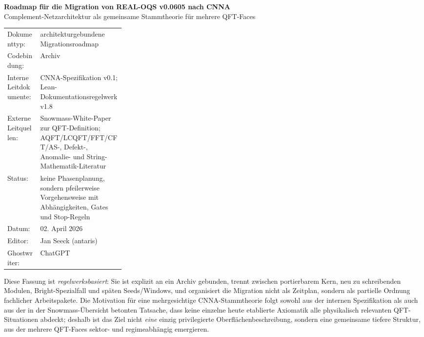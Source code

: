 \documentclass[11pt,a4paper]{article}
\let\oldpath\path
\renewcommand{\path}[1]{\oldpath{#1}}
\begin{document}

\begin{titlepage}
\centering
{\Large \textbf{Roadmap für die Migration von REAL-OQS v0.0605 nach CNNA}}\\[0.7em]
{\large Complement-Netzarchitektur als gemeinsame Stammtheorie für mehrere QFT-Faces}\\[2em]
\begin{tabularx}{0.92\linewidth}{@{}L{0.28\linewidth}X@{}}
Dokumenttyp: & architekturgebundene Migrationsroadmap \\
Codebindung: & Archiv  \\
Interne Leitdokumente: & CNNA-Spezifikation v0.1; Lean-Dokumentationsregelwerk v1.8 \\
Externe Leitquellen: & Snowmass-White-Paper zur QFT-Definition; AQFT/LCQFT/FFT/CFT/AS-, Defekt-, Anomalie- und String-Mathematik-Literatur \\
Status: & keine Phasenplanung, sondern pfeilerweise Vorgehensweise mit Abhängigkeiten, Gates und Stop-Regeln \\
Datum: & 02. April 2026 \\
Editor: & Jan Seeck (antaris) \\
Ghostwriter: & ChatGPT
\end{tabularx}
\vfill
\begin{minipage}{0.92\linewidth}
\small
Diese Fassung ist \emph{regelwerksbasiert}: Sie ist explizit an ein Archiv gebunden, trennt zwischen
portierbarem Kern, neu zu schreibenden Modulen, Bright-Spezialfall und späten Seeds/Windows,
und organisiert die Migration nicht als Zeitplan, sondern als partielle Ordnung fachlicher Arbeitspakete.
Die Motivation für eine mehrgesichtige CNNA-Stammtheorie folgt sowohl aus der internen
Spezifikation als auch aus der in der Snowmass-Übersicht betonten Tatsache, dass keine einzelne
heute etablierte Axiomatik alle physikalisch relevanten QFT-Situationen abdeckt; deshalb ist das Ziel
nicht \emph{eine} einzig privilegierte Oberflächenbeschreibung, sondern eine gemeinsame tiefere
Struktur, aus der mehrere QFT-Faces sektor- und regimeabhängig emergieren.\cite[Abstract; pp.~1, 4--6, 9--12]{Dedushenko2023}\cite[pp.~1--10, 20--36]{CNNASpec}\cite[pp.~7--8]{RulebookV18}
\end{minipage}
\vfill
\end{titlepage}

\clearpage
{}
\tableofcontents
\clearpage
\end{document}
